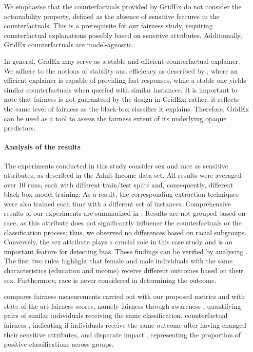 \documentclass[letterpaper]{article} %
\begin{document}
We emphasise that the counterfactuals provided by GridEx do not consider the actionability property, defined as the absence of sensitive features in the counterfactuals. This is a prerequisite for our fairness study, requiring counterfactual explanations possibly based on sensitive attributes. Additionally, GridEx counterfactuals are model-agnostic.

In general, GridEx may serve as a stable and efficient counterfactual explainer. We adhere to the notions of stability and efficiency as described by \citet{guidotti2022counterfactual}, where an efficient explainer is capable of providing fast responses, while a stable one yields similar counterfactuals when queried with similar instances.
%
It is important to note that fairness is not guaranteed by the design in GridEx; rather, it reflects the same level of fairness as the black-box classifier it explains. Therefore, GridEx can be used as a tool to assess the fairness extent of its underlying opaque predictors.

\paragraph{Analysis of the results}

The experiments conducted in this study consider sex and race as sensitive attributes, as described in the Adult Income data set.
%
All results were averaged over 10 runs, each with different train/test splits and, consequently, different black-box model training.
%
As a result, the corresponding extraction techniques were also trained each time with a different set of instances.
%
Comprehensive results of our experiments are summarized in  .
%
Results are not grouped based on race, as this attribute does not significantly influence the counterfactuals or the classification process; thus, we observed no differences based on racial subgroups.
%
Conversely, the sex attribute plays a crucial role in this case study and is an important feature for detecting bias.
%
These findings can be verified by analysing . The first two rules highlight that female and male individuals with the same characteristics (education and income) receive different outcomes based on their sex.
%
Furthermore, race is never considered in determining the outcome.

 compares fairness measurements carried out with our proposed metrics and with state-of-the-art fairness scores, namely fairness through awareness \cite{10.1145/2090236.2090255}, quantifying pairs of similar individuals receiving the same classification, counterfactual fairness \cite{NIPS2017_a486cd07}, indicating if individuals receive the same outcome after having changed their sensitive attributes, and disparate impact \cite{FeldmanFMSV15}, representing the proportion of positive classifications across groups.
\end{document}
